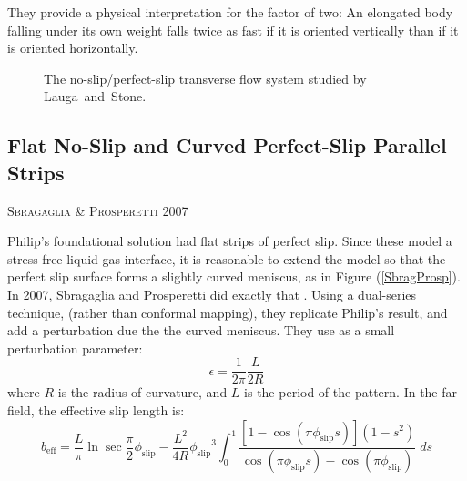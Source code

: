 \documentclass[12pt, a4paper, twoside, openright]{book}
\newcommand{\beff}{\ensuremath{b_{\mathrm{eff}}}}
\newcommand{\phislip}{\ensuremath{\phi_{\mathrm{slip}}}}
\newcommand{\paper}[1]
         {\colorbox[gray]{0.8}{ \textsc{#1}}
         
         }
\begin{document}
They provide a physical interpretation for the factor of two: An elongated body falling under its own weight falls twice as fast if it is oriented vertically than if it is oriented horizontally.

\begin{figure}[ht]
\centering
{}
\caption{The no-slip/perfect-slip transverse flow system studied by Lauga~and~Stone.} \label{LaugaStone}
\end{figure}

\clearpage
\subsection*{Flat No-Slip and Curved Perfect-Slip Parallel Strips}

\paper{Sbragaglia \& Prosperetti 2007}
Philip's foundational solution had flat strips of perfect slip.  Since these model a stress-free liquid-gas interface, it is reasonable to extend the model so that the perfect slip surface forms a slightly curved meniscus, as in Figure (\ref{SbragProsp}).  In 2007, Sbragaglia and Prosperetti did exactly that \cite{SbragagliaProsperetti2007}.  Using a dual-series technique, (rather than conformal mapping), they replicate Philip's result, and add a perturbation due the the curved meniscus.  They use as a small perturbation parameter:
\begin{equation}
\epsilon = \frac{1}{2\pi} \frac{L}{2R} 
\end{equation}
where $R$ is the radius of curvature, and $L$ is the period of the pattern.  In the far field, the effective slip length is:
\begin{equation}
\beff= \frac{L}{\pi}	\ln \sec \frac{\pi}{2} \phislip - \frac{L^2}{4R}\phislip^3 \int_0^1 
\frac{[1-\cos(\pi\phislip s)] (1-s^2) }{\cos(\pi\phislip s) - \cos(\pi\phislip)}
\; ds
\end{equation}
\end{document}
